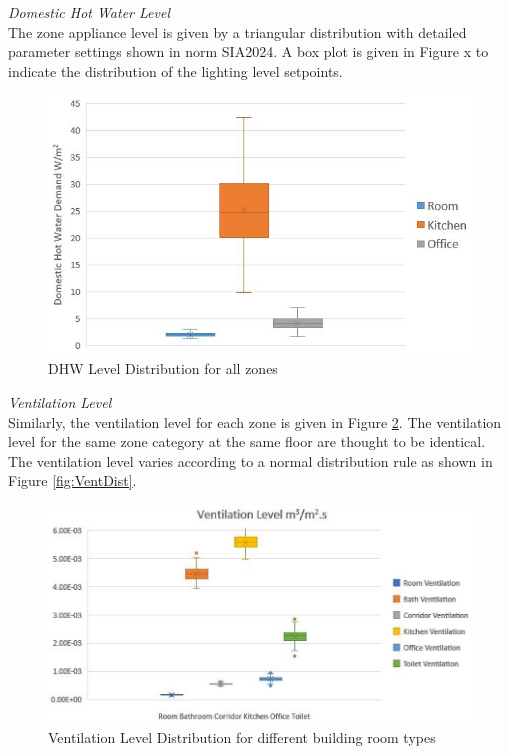 \documentclass[a4paper, oneside]{discothesis}
\begin{document}
		\textit{Domestic Hot Water Level}\\
			The zone appliance level is given by a triangular distribution with detailed parameter settings shown in norm SIA2024. A box plot is given in Figure x to indicate the distribution of the lighting level setpoints.\\


			\begin{figure}[h!]
			\centering
			\includegraphics[scale=0.7]{figures/DHWLevelDistribution.jpg}
			\caption{DHW Level Distribution for all zones}
			\label{fig:DHWDistribution}
			\end{figure}
		


		\textit{Ventilation Level}\\
			Similarly, the ventilation level for each zone is given in Figure \ref{fig:VentLevel}. The ventilation level for the same zone category at the same floor are thought to be identical. The ventilation level varies according to a normal distribution rule as shown in Figure \ref{fig:VentDist}.\\

			\begin{figure}[ht!]
			\centering
			\includegraphics[scale=0.68]{VentilationLevel.jpg}
			\caption{Ventilation Level Distribution for different building room types}
			\label{fig:VentLevel}
			\end{figure}
\end{document}
